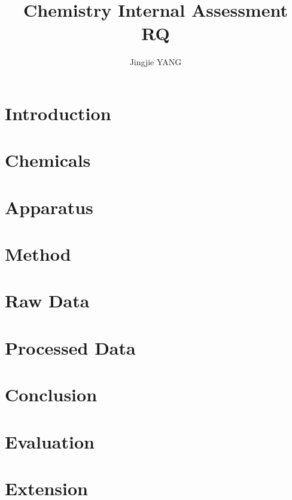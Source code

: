 \documentclass[a4paper, 12pt]{paper}
\title{
\textbf{Chemistry Internal Assessment}\\
\bigskip
RQ
}
\author{Jingjie YANG}
\date{}
\begin{document}
\maketitle

\section*{Introduction}

\section*{Chemicals}

\section*{Apparatus}

\section*{Method}

\section*{Raw Data}

\section*{Processed Data}

\section*{Conclusion}

\section*{Evaluation}

\section*{Extension}

\printbibliography
\end{document}
